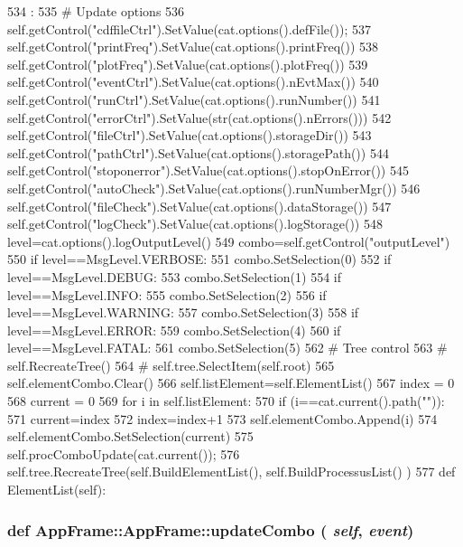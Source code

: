 \begin{DoxyCode}
534                     :
535         # Update options
536         self.getControl("cdffileCtrl").SetValue(cat.options().defFile());
537         self.getControl("printFreq").SetValue(cat.options().printFreq())
538         self.getControl("plotFreq").SetValue(cat.options().plotFreq())
539         self.getControl("eventCtrl").SetValue(cat.options().nEvtMax())
540         self.getControl("runCtrl").SetValue(cat.options().runNumber())
541         self.getControl("errorCtrl").SetValue(str(cat.options().nErrors()))
542         self.getControl("fileCtrl").SetValue(cat.options().storageDir())
543         self.getControl("pathCtrl").SetValue(cat.options().storagePath())
544         self.getControl("stoponerror").SetValue(cat.options().stopOnError())
545         self.getControl("autoCheck").SetValue(cat.options().runNumberMgr())
546         self.getControl("fileCheck").SetValue(cat.options().dataStorage())
547         self.getControl("logCheck").SetValue(cat.options().logStorage())
548         level=cat.options().logOutputLevel()
549         combo=self.getControl("outputLevel")
550         if level==MsgLevel.VERBOSE:
551             combo.SetSelection(0)
552         if level==MsgLevel.DEBUG:
553             combo.SetSelection(1)
554         if level==MsgLevel.INFO:
555             combo.SetSelection(2)
556         if level==MsgLevel.WARNING:
557             combo.SetSelection(3)
558         if level==MsgLevel.ERROR:
559             combo.SetSelection(4)
560         if level==MsgLevel.FATAL:
561             combo.SetSelection(5)
562         # Tree control
563 #        self.RecreateTree()        
564 #        self.tree.SelectItem(self.root)
565         self.elementCombo.Clear()
566         self.listElement=self.ElementList()
567         index   = 0
568         current = 0
569         for i in self.listElement:
570             if (i==cat.current().path("")):
571                 current=index
572             index=index+1
573             self.elementCombo.Append(i)
574         self.elementCombo.SetSelection(current)
575         self.procComboUpdate(cat.current());
576         self.tree.RecreateTree(self.BuildElementList(), self.BuildProcessusList()
      )
577 
    def ElementList(self):
\end{DoxyCode}
\hypertarget{classAppFrame_1_1AppFrame_a9dec5963f6ad7c33992ad7ec38567574}{
\subsubsection[{updateCombo}]{\setlength{\rightskip}{0pt plus 5cm}def AppFrame::AppFrame::updateCombo ( {\em self}, \/   {\em event})}}
\label{classAppFrame_1_1AppFrame_a9dec5963f6ad7c33992ad7ec38567574}


